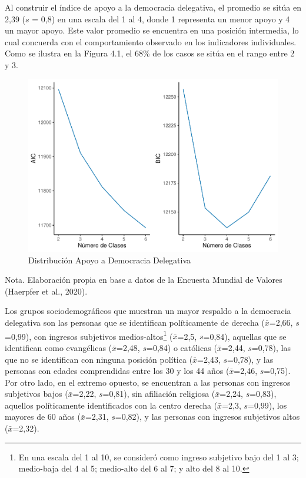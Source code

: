 \documentclass[12pt,twoside]{templates/facsothesis}
\begin{document}
\FloatBarrier

Al construir el índice de apoyo a la democracia delegativa, el promedio se sitúa en 2,39 (\(s\) = 0,8) en una escala del 1 al 4, donde 1 representa un menor apoyo y 4 un mayor apoyo. Este valor promedio se encuentra en una posición intermedia, lo cual concuerda con el comportamiento observado en los indicadores individuales. Como se ilustra en la Figura 4.1, el 68\% de los casos se sitúa en el rango entre 2 y 3.

\begin{figure}[!ht]

{\centering \includegraphics[width=1\linewidth,]{tesis_files/figure-latex/unnamed-chunk-9-1} 

}

\caption{Distribución Apoyo a Democracia Delegativa}\label{fig:unnamed-chunk-9}
\end{figure}
\FloatBarrier

Nota. Elaboración propia en base a datos de la Encuesta Mundial de Valores (Haerpfer et al., 2020).

Los grupos sociodemográficos que muestran un mayor respaldo a la democracia delegativa son las personas que se identifican políticamente de derecha (\(\bar{x}\)=2,66, \(s\)=0,99), con ingresos subjetivos medios-altos\footnote{En una escala del 1 al 10, se consideró como ingreso subjetivo bajo del 1 al 3; medio-baja del 4 al 5; medio-alto del 6 al 7; y alto del 8 al 10.} (\(\bar{x}\)=2,5, \(s\)=0,84), aquellas que se identifican como evangélicas (\(\bar{x}\)=2,48, \(s\)=0,84) o católicas (\(\bar{x}\)=2,44, \(s\)=0,78), las que no se identifican con ninguna posición política (\(\bar{x}\)=2,43, \(s\)=0,78), y las personas con edades comprendidas entre los 30 y los 44 años (\(\bar{x}\)=2,46, \(s\)=0,75). Por otro lado, en el extremo opuesto, se encuentran a las personas con ingresos subjetivos bajos (\(\bar{x}\)=2,22, \(s\)=0,81), sin afiliación religiosa (\(\bar{x}\)=2,24, \(s\)=0,83), aquellos políticamente identificados con la centro derecha (\(\bar{x}\)=2,3, \(s\)=0,99), los mayores de 60 años (\(\bar{x}\)=2,31, \(s\)=0,82), y las personas con ingresos subjetivos altos (\(\bar{x}\)=2,32).
\end{document}
